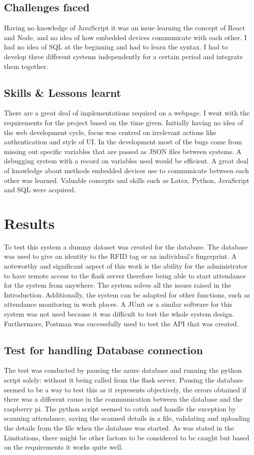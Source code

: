 \subsection{Challenges faced}
Having no knowledge of JavaScript it was an issue learning the concept of React and Node, and no idea of how embedded devices communicate with each other. I had no idea of SQL at the beginning and had to learn the syntax. I had to develop three different systems independently for a certain period and integrate them together.
\subsection{Skills \& Lessons learnt}
There are a great deal of implementations required on a webpage. I went with the requirements for the project based on the time given. Initially having no idea of the web development cycle, focus was centred on irrelevant actions like authentication and style of UI. In the development most of the bugs come from missing out specific variables that are passed as JSON files between systems. A debugging system with a record on variables used would be efficient. A great deal of knowledge about methods embedded devices use to communicate between each other was learned. Valuable concepts and skills such as Latex, Python, JavaScript and SQL were acquired.
\section{Results}
To test this system a dummy dataset was created for the database. The database was used to give an identity to the RFID tag or an individual's fingerprint. A noteworthy and significant aspect of this work is the ability for the administrator to have remote access to the flask server therefore being able to start attendance for the system from anywhere. The system solves all the issues raised in the Introduction. Additionally, the system can be adapted for other functions, such as attendance monitoring in work places. A JUnit or a similar software for this system was not used because it was difficult to test the whole system design. Furthermore, Postman was successfully used to test the API that was created.
\subsection*{Test for handling Database connection}
The test was conducted by pausing the azure database and running the python script solely: without it being called from the flask server. Pausing the database seemed to be a way to test this as it represents objectively, the errors obtained if there was a different cause in the communication between the database and the raspberry pi. The python script seemed to catch and handle the exception by scanning attendance, saving the scanned details in a file, validating and uploading the details from the file when the database was started. As was stated in the Limitations, there might be other factors to be considered to be caught but based on the requirements it works quite well.
 
